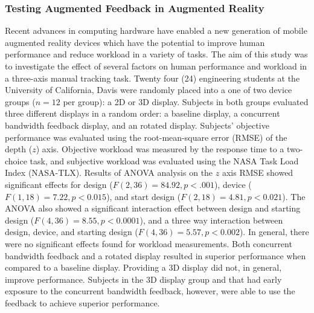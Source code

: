 \subsubsection{Testing Augmented Feedback in Augmented Reality}
Recent advances in computing hardware have enabled a new generation of mobile augmented reality devices which have the potential to improve human performance and reduce workload in a variety of tasks.
The aim of this study was to investigate the effect of several factors on human performance and workload in a three-axis manual tracking task.
Twenty four (24) engineering students at the University of California, Davis were randomly placed into a one of two device groups ($n=12$ per group): a 2D or 3D display.
Subjects in both groups evaluated three different displays in a random order: a baseline display, a concurrent bandwidth feedback display, and an rotated display.
Subjects' objective performance was evaluated using the root-mean-square error (RMSE) of the depth ($z$) axis.
Objective workload was measured by the response time to a two-choice task, and subjective workload was evaluated using the NASA Task Load Index (NASA-TLX).
Results of ANOVA analysis on the $z$ axis RMSE showed significant effects for design ($F(2, 36)=84.92, p<.001$), device ($F(1, 18)=7.22, p<0.015$), and start design ($F(2, 18)=4.81, p<0.021$).
The ANOVA also showed a significant interaction effect between design and starting design ($F(4, 36)=8.55, p<0.0001$), and a three way interaction between design, device, and starting design ($F(4, 36)=5.57, p<0.002$).
In general, there were no significant effects found for workload measurements.
Both concurrent bandwidth feedback and a rotated display resulted in superior performance when compared to a baseline display.
Providing a 3D display did not, in general, improve performance.
Subjects in the 3D display group and that had early exposure to the concurrent bandwidth feedback, however, were able to use the feedback to achieve superior performance.

